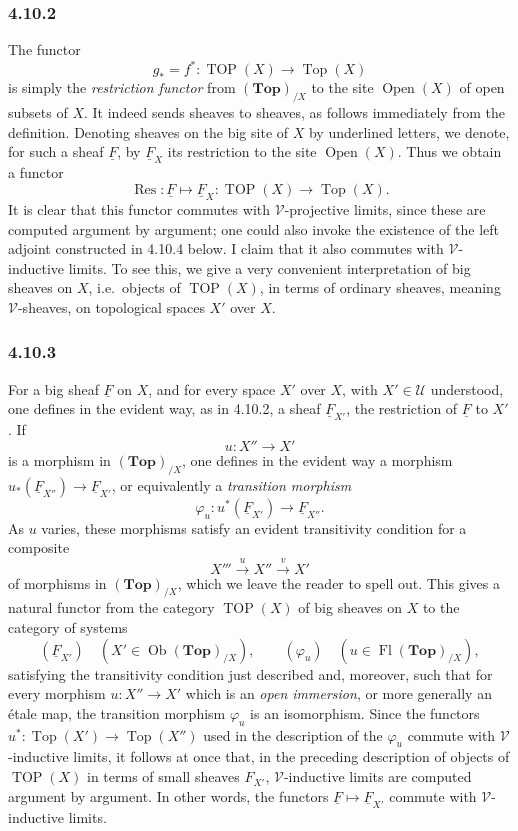 \documentclass[11pt]{article}
\newcommand{\U}{\mathcal{U}}
\newcommand{\V}{\mathcal{V}}
\newcommand{\Esp}{\mathbf{Top}}
\newcommand{\Top}{\operatorname{Top}}
\newcommand{\TOP}{\operatorname{TOP}}
\newcommand{\Open}{\operatorname{Open}}
\newcommand{\Ob}{\operatorname{Ob}}
\newcommand{\Fl}{\operatorname{Fl}}
\newcommand{\Res}{\operatorname{Res}}
\newcommand{\ie}{i.e.}
\providecommand{\Ob}{\operatorname{Ob}}
\begin{document}
\subsubsection*{4.10.2}
The functor
\[
g_\ast=f^\ast:\TOP(X)\longrightarrow\Top(X)
\]
is simply the \emph{restriction functor} from \((\Esp)_{/X}\) to the site \(\Open(X)\) of open subsets of \(X\). It indeed sends sheaves to sheaves, as follows immediately from the definition. Denoting sheaves on the big site of \(X\) by underlined letters, we denote, for such a sheaf \(\underline F\), by \(\underline F_X\) its restriction to the site \(\Open(X)\). Thus we obtain a functor
\[
\Res:\underline F\longmapsto \underline F_X:
\TOP(X)\longrightarrow\Top(X).\tag{4.10.2.1}
\]
It is clear that this functor commutes with \(\V\)-projective limits, since these are computed argument by argument; one could also invoke the existence of the left adjoint constructed in 4.10.4 below. I claim that it also commutes with \(\V\)-inductive limits. To see this, we give a very convenient interpretation of big sheaves on \(X\), \ie\ objects of \(\TOP(X)\), in terms of ordinary sheaves, meaning \(\V\)-sheaves, on topological spaces \(X'\) over \(X\).

\subsubsection*{4.10.3}
For a big sheaf \(\underline F\) on \(X\), and for every space \(X'\) over \(X\), with \(X'\in\U\) understood, one defines in the evident way, as in 4.10.2, a sheaf \(\underline F_{X'}\), the restriction of \(\underline F\) to \(X'\). If
\[
u:X''\longrightarrow X'
\]
is a morphism in \((\Esp)_{/X}\), one defines in the evident way a morphism \(u_\ast(\underline F_{X''})\to\underline F_{X'}\), or equivalently a \emph{transition morphism}
\[
\varphi_u:u^\ast(\underline F_{X'})\longrightarrow\underline F_{X''}.\tag{4.10.3.1}
\]
As \(u\) varies, these morphisms satisfy an evident transitivity condition for a composite
\[
X'''\xrightarrow{u}X''\xrightarrow{v}X'
\]
of morphisms in \((\Esp)_{/X}\), which we leave the reader to spell out. This gives a natural functor from the category \(\TOP(X)\) of big sheaves on \(X\) to the category of systems
\[
(\underline F_{X'})\quad(X'\in\Ob(\Esp)_{/X}),
\qquad
(\varphi_u)\quad(u\in\Fl(\Esp)_{/X}),
\]
satisfying the transitivity condition just described and, moreover, such that for every morphism \(u:X''\to X'\) which is an \emph{open immersion}, or more generally an \'etale map, the transition morphism \(\varphi_u\) is an isomorphism. Since the functors \(u^\ast:\Top(X')\to\Top(X'')\) used in the description of the \(\varphi_u\) commute with \(\V\)-inductive limits, it follows at once that, in the preceding description of objects of \(\TOP(X)\) in terms of small sheaves \(F_{X'}\), \(\V\)-inductive limits are computed argument by argument. In other words, the functors \(\underline F\mapsto\underline F_{X'}\) commute with \(\V\)-inductive limits.
\end{document}
